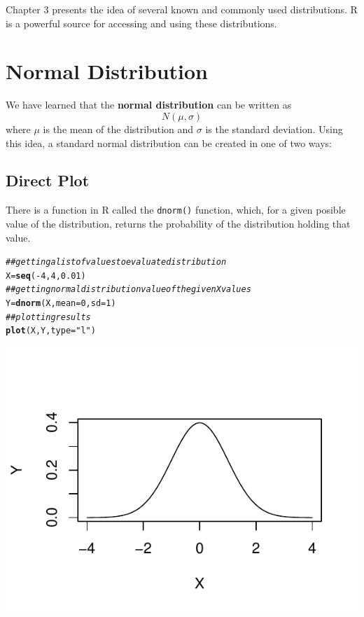\documentclass{report}\usepackage[]{graphicx}\usepackage[]{color}
\makeatletter
\def\maxwidth{ %
  \ifdim\Gin@nat@width>\linewidth
    \linewidth
  \else
    \Gin@nat@width
  \fi
}
\newcommand{\hlnum}[1]{\textcolor[rgb]{0.686,0.059,0.569}{#1}}%
\newcommand{\hlstr}[1]{\textcolor[rgb]{0.192,0.494,0.8}{#1}}%
\newcommand{\hlcom}[1]{\textcolor[rgb]{0.678,0.584,0.686}{\textit{#1}}}%
\newcommand{\hlopt}[1]{\textcolor[rgb]{0,0,0}{#1}}%
\newcommand{\hlstd}[1]{\textcolor[rgb]{0.345,0.345,0.345}{#1}}%
\newcommand{\hlkwb}[1]{\textcolor[rgb]{0.69,0.353,0.396}{#1}}%
\newcommand{\hlkwc}[1]{\textcolor[rgb]{0.333,0.667,0.333}{#1}}%
\newcommand{\hlkwd}[1]{\textcolor[rgb]{0.737,0.353,0.396}{\textbf{#1}}}%
\newenvironment{kframe}{%
 \def\at@end@of@kframe{}%
 \ifinner\ifhmode%
  \def\at@end@of@kframe{\end{minipage}}%
  \begin{minipage}{\columnwidth}%
 \fi\fi%
 \def\FrameCommand##1{\hskip\@totalleftmargin \hskip-\fboxsep
 \colorbox{shadecolor}{##1}\hskip-\fboxsep
     \hskip-\linewidth \hskip-\@totalleftmargin \hskip\columnwidth}%
 \MakeFramed {\advance\hsize-\width
   \@totalleftmargin\z@ \linewidth\hsize
   \@setminipage}}%
 {\par\unskip\endMakeFramed%
 \at@end@of@kframe}
\newenvironment{knitrout}{}{} %
\makeatother
\begin{document}
\vspace{0.5cm} 

Chapter 3 presents the idea of several known and commonly used distributions.  R is a powerful source for accessing and using these distributions.

\section{Normal Distribution}
We have learned that the \textbf{normal distribution} can be written as 
\[ N(\mu, \sigma) \]
where $\mu$ is the mean of the distribution and $\sigma$ is the standard deviation.  Using this idea, a standard normal distribution can be created in one of two ways: 

\subsection{Direct Plot}
There is a function in R called the \texttt{dnorm()} function, which, for a given posible value of the distribution, returns the probability of the distribution holding that value.  
\begin{knitrout}
\color{fgcolor}\begin{kframe}
\begin{alltt}
\hlcom{## getting a list of values to evaluate distribution}
\hlstd{X} \hlkwb{=} \hlkwd{seq}\hlstd{(}\hlopt{-}\hlnum{4}\hlstd{,} \hlnum{4}\hlstd{,} \hlnum{0.01}\hlstd{)}
\hlcom{## getting normal distribution value of the given X values }
\hlstd{Y} \hlkwb{=} \hlkwd{dnorm}\hlstd{(X,} \hlkwc{mean} \hlstd{=} \hlnum{0}\hlstd{,} \hlkwc{sd} \hlstd{=} \hlnum{1}\hlstd{)}
\hlcom{## plotting results }
\hlkwd{plot}\hlstd{(X,Y,} \hlkwc{type} \hlstd{=} \hlstr{"l"}\hlstd{)}
\end{alltt}
\end{kframe}

{\centering \includegraphics[width=\maxwidth]{figure/unnamed-chunk-51-1} 

}



\end{knitrout}
\end{document}
